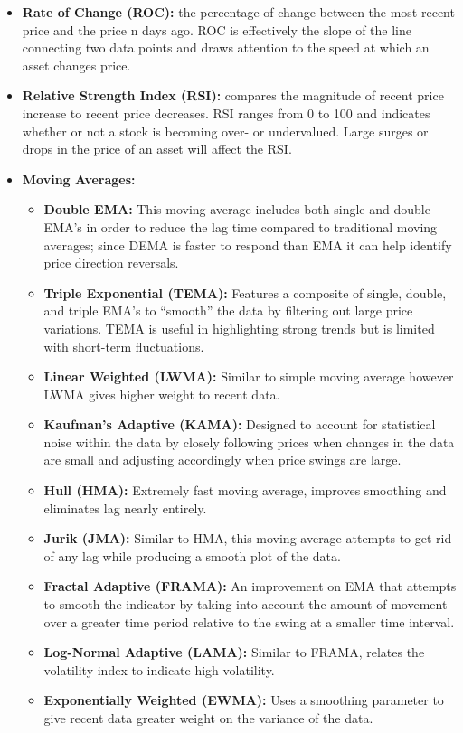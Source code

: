 \documentclass[11pt]{article}
\begin{document}
\begin{itemize}
\item \textbf{Rate of Change (ROC):} the percentage of change between the most recent price and the price n days ago. ROC is effectively the slope of the line connecting two data points and draws attention to the speed at which an asset changes price.
\item \textbf{Relative Strength Index (RSI):} compares the magnitude of recent price increase to recent price decreases. RSI ranges from 0 to 100 and indicates whether or not a stock is becoming over- or undervalued. Large surges or drops in the price of an asset will affect the RSI.
\item \textbf{Moving Averages:}
\begin{itemize}
\item \textbf{Double EMA:} This moving average includes both single and double EMA’s in order to reduce the lag time compared to traditional moving averages; since DEMA is faster to respond than EMA it can help identify price direction reversals.
\item \textbf{Triple Exponential (TEMA):} Features a composite of single, double, and triple EMA’s to “smooth” the data by filtering out large price variations. TEMA is useful in highlighting strong trends but is limited with short-term fluctuations.
\item \textbf{Linear Weighted (LWMA):} Similar to simple moving average however LWMA gives higher weight to recent data.
\item \textbf{Kaufman’s Adaptive (KAMA):} Designed to account for statistical noise within the data by closely following prices when changes in the data are small and adjusting accordingly when price swings are large.
\item \textbf{Hull (HMA):} Extremely fast moving average, improves smoothing and eliminates lag nearly entirely.
\item \textbf{Jurik (JMA):} Similar to HMA, this moving average attempts to get rid of any lag while producing a smooth plot of the data.
\item \textbf{Fractal Adaptive (FRAMA):} An improvement on EMA that attempts to smooth the indicator by taking into account the amount of movement over a greater time period relative to the swing at a smaller time interval.
\item \textbf{Log-Normal Adaptive (LAMA):} Similar to FRAMA, relates the volatility index to indicate high volatility.
\item \textbf{Exponentially Weighted (EWMA):} Uses a smoothing parameter to give recent data greater weight on the variance of the data.
\end{itemize}
\end{itemize}
\end{document}
